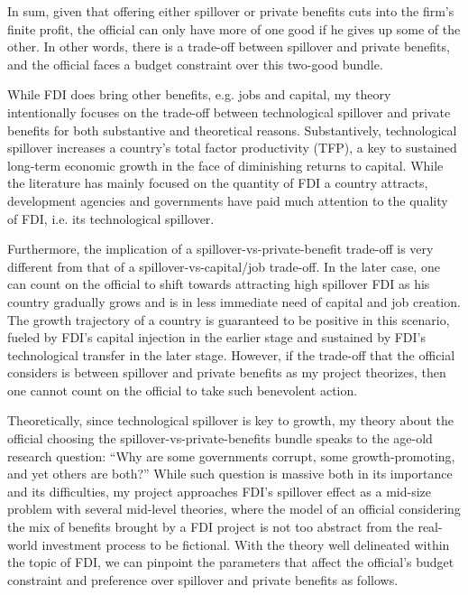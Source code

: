 In sum, given that offering either spillover or private benefits cuts into the firm's finite profit, the official can only have more of one good if he gives up some of the other. In other words, there is a trade-off between spillover and private benefits, and the official faces a budget constraint over this two-good bundle.

While FDI does bring other benefits, e.g. jobs and capital, my theory intentionally focuses on the trade-off between technological spillover and private benefits for both substantive and theoretical reasons. Substantively, technological spillover increases a country's total factor productivity (TFP), a key to sustained long-term economic growth in the face of diminishing returns to capital. While the literature has mainly focused on the quantity of FDI a country attracts, development agencies and governments have paid much attention to the quality of FDI, i.e. its technological spillover. 

Furthermore, the implication of a spillover-vs-private-benefit trade-off is very different from that of a spillover-vs-capital/job trade-off. In the later case, one can count on the official to shift towards attracting high spillover FDI as his country gradually grows and is in less immediate need of capital and job creation. The growth trajectory of a country is guaranteed to be positive in this scenario, fueled by FDI's capital injection in the earlier stage and sustained by FDI's technological transfer in the later stage. However, if the trade-off that the official considers is between spillover and private benefits as my project theorizes, then one cannot count on the official to take such benevolent action.

Theoretically, since technological spillover is key to growth, my theory about the official choosing the spillover-vs-private-benefits bundle speaks to the age-old research question: ``Why are some governments corrupt, some growth-promoting, and yet others are both?'' While such question is massive both in its importance and its difficulties, my project approaches FDI's spillover effect as a mid-size problem with several mid-level theories, where the model of an official considering the mix of benefits brought by a FDI project is not too abstract from the real-world investment process to be fictional. With the theory well delineated within the topic of FDI, we can pinpoint the parameters that affect the official's budget constraint and preference over spillover and private benefits as follows.

